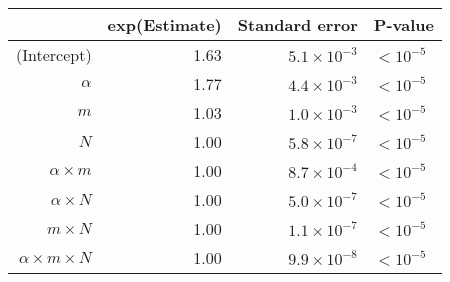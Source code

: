 \begin{tabular}{rrrl}
  \hline
 & exp(Estimate) & Standard error & P-value \\ 
  \hline
(Intercept) & 1.63 & $5.1 \times 10^{-3}$ & $<10^{-5}$ \\ 
  $\alpha$ & 1.77 & $4.4 \times 10^{-3}$ & $<10^{-5}$ \\ 
  $m$ & 1.03 & $1.0 \times 10^{-3}$ & $<10^{-5}$ \\ 
  $N$ & 1.00 & $5.8 \times 10^{-7}$ & $<10^{-5}$ \\ 
  $\alpha \times m$ & 1.00 & $8.7 \times 10^{-4}$ & $<10^{-5}$ \\ 
  $\alpha \times N$ & 1.00 & $5.0 \times 10^{-7}$ & $<10^{-5}$ \\ 
  $m \times N$ & 1.00 & $1.1 \times 10^{-7}$ & $<10^{-5}$ \\ 
  $\alpha \times m \times N$ & 1.00 & $9.9 \times 10^{-8}$ & $<10^{-5}$ \\ 
   \hline
\end{tabular}
